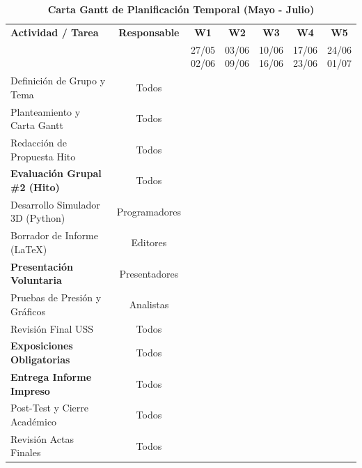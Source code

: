 \documentclass[11pt,a4paper]{article}
\begin{document}
\begin{table}[H]
\centering\small
\caption{\textbf{Carta Gantt de Planificación Temporal (Mayo - Julio)}}
\vspace{0.3cm}
\begin{tabular}{l c ccccc}
\toprule
\textbf{Actividad / Tarea} & \textbf{Responsable} & \textbf{W1} & \textbf{W2} & \textbf{W3} & \textbf{W4} & \textbf{W5} \\
 & & \shortstack{\small 27/05 \\ \small 02/06} & \shortstack{\small 03/06 \\ \small 09/06} & \shortstack{\small 10/06 \\ \small 16/06} & \shortstack{\small 17/06 \\ \small 23/06} & \shortstack{\small 24/06 \\ \small 01/07} \\
\midrule
Definición de Grupo y Tema & Todos & \cellcolor{GanttBlue} & & & & \\
Planteamiento y Carta Gantt & Todos & \cellcolor{GanttBlue} & & & & \\
Redacción de Propuesta Hito & Todos & \cellcolor{GanttBlue} & & & & \\
\rowcolor{LightGray}
\textbf{Evaluación Grupal \#2 (Hito)} & Todos & & \cellcolor{GanttBlue} & & & \\
Desarrollo Simulador 3D (Python) & Programadores & & \cellcolor{GanttBlue} & & & \\
Borrador de Informe (LaTeX) & Editores & & \cellcolor{GanttBlue} & & & \\
\rowcolor{LightGray}
\textbf{Presentación Voluntaria} & Presentadores & & & \cellcolor{GanttBlue} & & \\
Pruebas de Presión y Gráficos & Analistas & & & \cellcolor{GanttBlue} & & \\
Revisión Final USS & Todos & & & \cellcolor{GanttBlue} & & \\
\rowcolor{LightGray}
\textbf{Exposiciones Obligatorias} & Todos & & & & \cellcolor{GanttBlue} & \\
\rowcolor{LightGray}
\textbf{Entrega Informe Impreso} & Todos & & & & \cellcolor{GanttBlue} & \\
Post-Test y Cierre Académico & Todos & & & & & \cellcolor{GanttBlue} \\
Revisión Actas Finales & Todos & & & & & \cellcolor{GanttBlue} \\
\bottomrule
\end{tabular}
\end{table}
\end{document}
